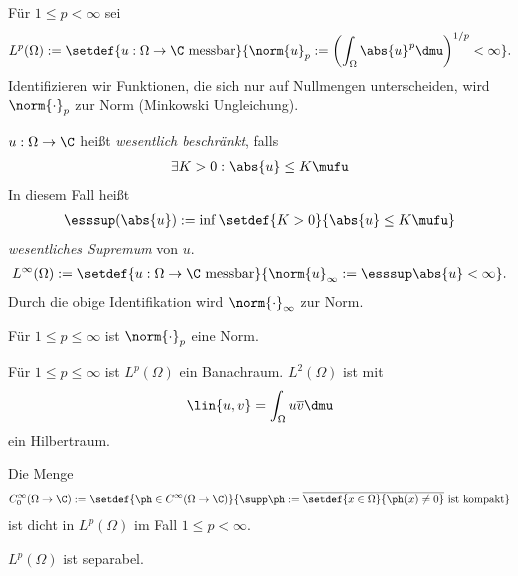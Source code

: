 \begin{defn}
\label{defn:7.18}
\begin{defnenum}
\item Für $1\le p < \infty$ sei
\begin{align*}
L^p(\Omega) := \setdef{u:\Omega\to\C \text{ messbar}}{\norm{u}_p := \left(
\int_\Omega \abs{u}^p \dmu
\right)^{1/p} < \infty}.
\end{align*}
Identifizieren wir Funktionen, die sich nur auf Nullmengen unterscheiden, wird
$\norm{\cdot}_p$ zur Norm (Minkowski Ungleichung).
\item $u: \Omega\to \C$ heißt \emph{wesentlich beschränkt}, falls
\begin{align*}
\exists K > 0 : \abs{u}\le K\mufu
\end{align*} 
In diesem Fall heißt
\begin{align*}
\esssup(\abs{u}) := \inf\setdef{K>0}{\abs{u}\le K \mufu}
\end{align*}
\emph{wesentliches Supremum} von $u$.
\begin{align*}
L^\infty(\Omega) := \setdef{u:\Omega \to \C\text{ messbar}}{\norm{u}_\infty :=
\esssup\abs{u} < \infty}.
\end{align*}
Durch die obige Identifikation wird $\norm{\cdot}_\infty$ zur Norm.\fishhere
\end{defnenum}
\end{defn}

\begin{prop}
\label{prop:7.19}
\begin{propenum}
\item Für $1\le p\le \infty$ ist $\norm{\cdot}_p$ eine Norm.
\item Für $1\le p \le \infty$ ist $L^p(\Omega)$ ein Banachraum. $L^2(\Omega)$
ist mit
\begin{align*}
\lin{u,v} = \int_\Omega u\overline{v}\dmu
\end{align*}
ein Hilbertraum.\fishhere
\end{propenum}
\end{prop}

\begin{prop}
\label{prop:7.20}
\begin{propenum}
\item Die Menge
\begin{align*}
C_0^\infty (\Omega \to \C) :=
\setdef{\ph\in C^\infty(\Omega\to \C)}{\supp \ph := \overline{\setdef{x\in
\Omega}{\ph(x)\neq 0}}\text{ ist kompakt}}
\end{align*}
ist dicht in $L^p(\Omega)$ im Fall $1\le p < \infty$.
\item $L^p(\Omega)$ ist separabel.\fishhere
\end{propenum}
\end{prop}

